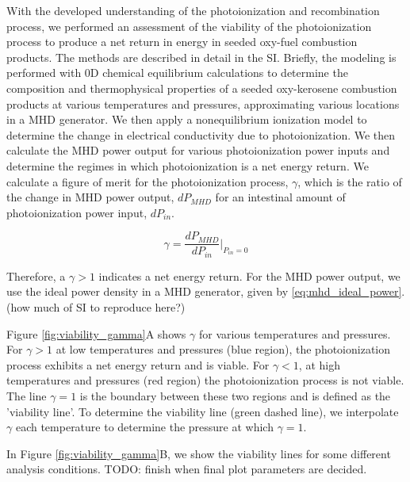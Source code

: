 With the developed understanding of the photoionization and recombination process, we performed an assessment of the viability of the photoionization process to produce a net return in energy in seeded oxy-fuel combustion products. The methods are described in detail in the SI. Briefly, the modeling is performed with 0D chemical equilibrium calculations to determine the composition and thermophysical properties of a seeded oxy-kerosene combustion products at various temperatures and pressures, approximating various locations in a MHD generator. We then apply a nonequilibrium ionization model to determine the change in electrical conductivity due to photoionization. We then calculate the MHD power output for various photoionization power inputs and determine the regimes in which photoionization is a net energy return. We calculate a figure of merit for the photoionization process, $\gamma$, which is the ratio of the change in MHD power output, $dP_{MHD}$ for an intestinal amount of photoionization power input, $dP_{in}$. 


\begin{equation}
\gamma = \frac{dP_{MHD}}{dP_{in}} \Big|_{P_{in}=0}
\end{equation}

Therefore, a $\gamma > 1$ indicates a net energy return. For the MHD power output, we use the ideal power density in a MHD generator, given by \ref{eq:mhd_ideal_power}. (how much of SI to reproduce here?)

Figure \ref{fig:viability_gamma}A shows $\gamma$ for various temperatures and pressures.  For $\gamma > 1$ at low temperatures and pressures (blue region), the photoionization process exhibits a net energy return and is viable. For $\gamma < 1$, at high temperatures and pressures (red region) the photoionization process is not viable. The line $\gamma = 1$ is the boundary between these two regions and is defined as the 'viability line'. To determine the viability line (green dashed  line), we interpolate $\gamma$ each temperature to determine the pressure at which $\gamma = 1$. 

In Figure \ref{fig:viability_gamma}B, we show the viability lines for some different analysis conditions. TODO: finish when final plot parameters are decided. 


